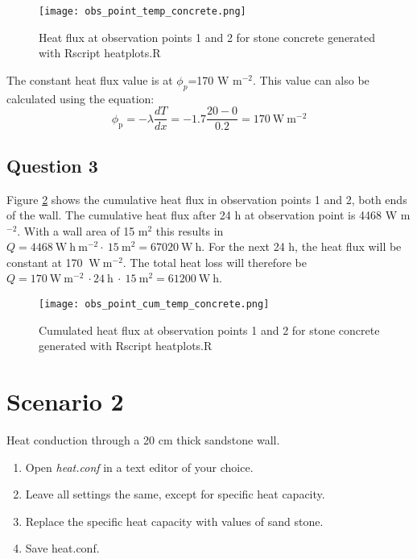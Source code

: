 \documentclass[
10pt, %
a4paper, %
oneside, %
headinclude,footinclude, %
BCOR5mm, %
]{scrartcl}
\begin{document}
\begin{figure}[!h]
\centering
\texttt{[image: obs\_point\_temp\_concrete.png]}
\caption{\label{plot2} Heat flux at observation points 1 and 2 for stone concrete generated with Rscript heatplots.R}
\end{figure}

The constant heat flux value is at $\phi_{p}$=170 W m$^{-2}$. This value can also be calculated using the equation:
\begin{equation*}
\phi_{\mathrm{p}}=-\lambda\frac{dT}{dx}= -1.7 \frac{20-0}{0.2}= 170 \mathrm{~W~m^{-2}}
\end{equation*}

\newpage
\subsection*{Question 3}

Figure \ref{plot3} shows the cumulative heat flux in observation points 1 and 2, both ends of the wall. The cumulative heat flux after 24 h at observation point is 4468 W m$^{-2}$. With a wall area of 15 m$^2$ this results in $Q = 4468~\mathrm{W~h~m^{-2}}\cdot~15~\mathrm{m^{2}}= 67020 ~\mathrm{W~h}$. 
For the next 24 h, the heat flux will be constant at 170 $\mathrm{~W~m^{-2}}$. The total heat loss will therefore be $Q=170 \mathrm{~W~m^{-2}}~\cdot 24~\mathrm{h}~\cdot~15~\mathrm{m^{2}}=61200 \mathrm{~W~h}$.

\begin{figure}[!h]
\centering
\texttt{[image: obs\_point\_cum\_temp\_concrete.png]}
\caption{\label{plot3} Cumulated heat flux at observation points 1 and 2 for stone concrete generated with Rscript heatplots.R}
\end{figure}

\newpage

\section*{Scenario 2}
Heat conduction through a 20 cm thick sandstone wall. 

\begin{enumerate}
\item Open \emph{heat.conf} in a text editor of your choice. 
\item Leave all settings the same, except for specific heat capacity. 
\item Replace the specific heat capacity with values of sand stone.
\item Save heat.conf.
\end{enumerate}
\end{document}
